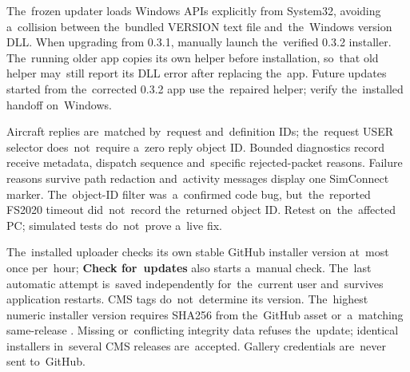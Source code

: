 \documentclass[11pt,a4paper]{article}
\newcommand{\filepath}[1]{\path{#1}}
\newcommand{\ui}[1]{\textbf{#1}}
\begin{document}
The~frozen updater loads Windows APIs explicitly from System32, avoiding
a~collision between the~bundled VERSION text file and~the~Windows version DLL.
When upgrading from 0.3.1, manually launch the~verified 0.3.2 installer.
The~running older app copies its own helper before installation, so~that old
helper may~still report its DLL error after replacing the~app. Future updates
started from the~corrected 0.3.2 app use the~repaired helper; verify
the~installed handoff on~Windows.

Aircraft replies are~matched by~request and~definition IDs; the~request USER
selector does~not~require a~zero reply object ID. Bounded diagnostics record
receive metadata, dispatch sequence and~specific rejected-packet reasons.
Failure reasons survive path redaction and~activity messages display one
SimConnect marker. The~object-ID filter was~a~confirmed code bug,
but~the~reported FS2020 timeout did~not~record the~returned object ID. Retest
on~the~affected PC; simulated tests do~not~prove a~live fix.

The~installed uploader checks its own stable GitHub installer version at~most
once per~hour; \ui{Check for~updates} also starts a~manual check. The~last
automatic attempt is~saved independently for~the~current user and~survives
application restarts. CMS tags do~not~determine its version. The~highest numeric
installer version requires SHA256 from the~GitHub asset or~a~matching
same-release \filepath{winapp-update.json}. Missing or~conflicting integrity
data refuses the~update; identical installers in~several CMS releases
are~accepted. Gallery credentials are~never sent to~GitHub.
\end{document}
